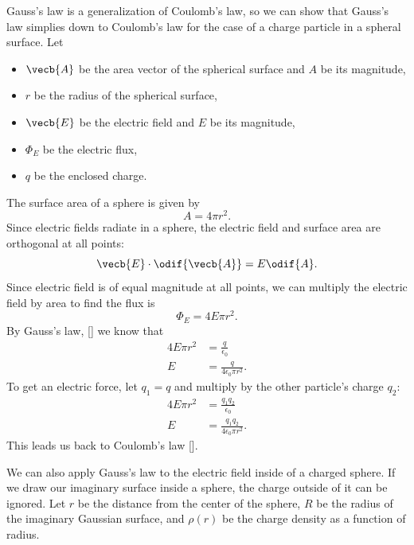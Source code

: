 Gauss's law is a generalization of Coulomb's law,
so we can show that Gauss's law simplies down to Coulomb's law
for the case of a charge particle in a spheral surface.
Let
\begin{itemize}
    \item \(\vecb{A}\) be the area vector of the spherical surface
        and \(A\) be its magnitude,
    \item \(r\) be the radius of the spherical surface,
    \item \(\vecb{E}\) be the electric field and \(E\) be its magnitude,
    \item \(\Phi_E\) be the electric flux,
    \item \(q\) be the enclosed charge.
\end{itemize}
The surface area of a sphere is given by
\begin{equation}
    A = 4 \pi r^2.
\end{equation}
Since electric fields radiate in a sphere,
the electric field and surface area are orthogonal at all points:
\begin{equation}
    \vecb{E} \cdot \odif{\vecb{A}} = E \odif{A}.
\end{equation}
Since electric field is of equal magnitude at all points,
we can multiply the electric field by area to find the flux is
\begin{equation}
    \Phi_E = 4 E \pi r^2.
\end{equation}
By Gauss's law, [] we know that
\begin{equation}
    \begin{aligned}
        4 E \pi r^2 &= \frac{q}{\epsilon_0} \\
        E &= \frac{q}{4 \epsilon_0 \pi r^2}.
    \end{aligned}
\end{equation}
To get an electric force,
let \(q_1 = q\) and multiply by the other particle's charge \(q_2\):
\begin{equation*}
    \begin{aligned}
        4 E \pi r^2 &= \frac{q_1 q_2}{\epsilon_0} \\
        E &= \frac{q_1 q_2}{4 \epsilon_0 \pi r^2}.
    \end{aligned}
\end{equation*}
This leads us back to Coulomb's law [].

We can also apply Gauss's law to the electric field inside of a charged sphere.
If we draw our imaginary surface inside a sphere,
the charge outside of it can be ignored.
Let \(r\) be the distance from the center of the sphere,
\(R\) be the radius of the imaginary Gaussian surface,
and \(\rho(r)\) be the charge density as a function of radius.

